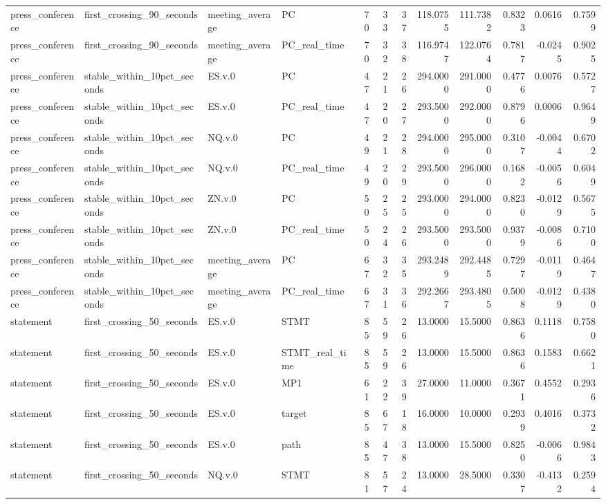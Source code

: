 \begin{tabular}{llllrrrrrrrr}
press_conference & first_crossing_90_seconds & meeting_average & PC & 70 & 33 & 37 & 118.0755 & 111.7382 & 0.8323 & 0.0616 & 0.7599 \\
press_conference & first_crossing_90_seconds & meeting_average & PC_real_time & 70 & 32 & 38 & 116.9747 & 122.0764 & 0.7817 & -0.0245 & 0.9025 \\
press_conference & stable_within_10pct_seconds & ES.v.0 & PC & 47 & 21 & 26 & 294.0000 & 291.0000 & 0.4776 & 0.0076 & 0.5727 \\
press_conference & stable_within_10pct_seconds & ES.v.0 & PC_real_time & 47 & 20 & 27 & 293.5000 & 292.0000 & 0.8796 & 0.0006 & 0.9649 \\
press_conference & stable_within_10pct_seconds & NQ.v.0 & PC & 49 & 21 & 28 & 294.0000 & 295.0000 & 0.3107 & -0.0044 & 0.6702 \\
press_conference & stable_within_10pct_seconds & NQ.v.0 & PC_real_time & 49 & 20 & 29 & 293.5000 & 296.0000 & 0.1682 & -0.0056 & 0.6049 \\
press_conference & stable_within_10pct_seconds & ZN.v.0 & PC & 50 & 25 & 25 & 293.0000 & 294.0000 & 0.8230 & -0.0129 & 0.5675 \\
press_conference & stable_within_10pct_seconds & ZN.v.0 & PC_real_time & 50 & 24 & 26 & 293.5000 & 293.5000 & 0.9379 & -0.0086 & 0.7100 \\
press_conference & stable_within_10pct_seconds & meeting_average & PC & 67 & 32 & 35 & 293.2489 & 292.4485 & 0.7297 & -0.0119 & 0.4647 \\
press_conference & stable_within_10pct_seconds & meeting_average & PC_real_time & 67 & 31 & 36 & 292.2667 & 293.4805 & 0.5008 & -0.0129 & 0.4380 \\
statement & first_crossing_50_seconds & ES.v.0 & STMT & 85 & 59 & 26 & 13.0000 & 15.5000 & 0.8636 & 0.1118 & 0.7580 \\
statement & first_crossing_50_seconds & ES.v.0 & STMT_real_time & 85 & 59 & 26 & 13.0000 & 15.5000 & 0.8636 & 0.1583 & 0.6621 \\
statement & first_crossing_50_seconds & ES.v.0 & MP1 & 61 & 22 & 39 & 27.0000 & 11.0000 & 0.3671 & 0.4552 & 0.2936 \\
statement & first_crossing_50_seconds & ES.v.0 & target & 85 & 67 & 18 & 16.0000 & 10.0000 & 0.2939 & 0.4016 & 0.3732 \\
statement & first_crossing_50_seconds & ES.v.0 & path & 85 & 47 & 38 & 13.0000 & 15.5000 & 0.8250 & -0.0066 & 0.9843 \\
statement & first_crossing_50_seconds & NQ.v.0 & STMT & 81 & 57 & 24 & 13.0000 & 28.5000 & 0.3307 & -0.4132 & 0.2594 \\

\end{tabular}
